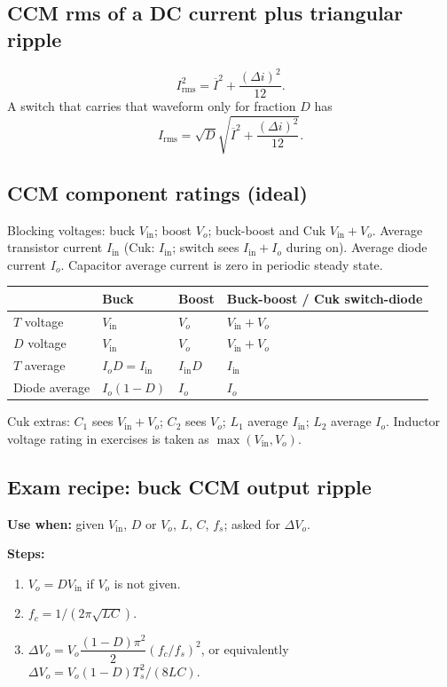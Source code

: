 \subsection{CCM rms of a DC current plus triangular ripple}
\[
I_{\mathrm{rms}}^2=\overline{I}^2+\frac{(\Delta i)^2}{12}.
\]
A switch that carries that waveform only for fraction \(D\) has
\[
I_{\mathrm{rms}}=\sqrt{D}\sqrt{\overline{I}^2+\frac{(\Delta i)^2}{12}}.
\]

\subsection{CCM component ratings (ideal)}
Blocking voltages: buck \(V_{\mathrm{in}}\); boost \(V_o\); buck-boost and Cuk \(V_{\mathrm{in}}+V_o\). Average transistor current \(I_{\mathrm{in}}\) (Cuk: \(I_{\mathrm{in}}\); switch sees \(I_{\mathrm{in}}+I_o\) during on). Average diode current \(I_o\). Capacitor average current is zero in periodic steady state.

\begin{center}
\begin{tabular}{@{}llll@{}}
\toprule
 & Buck & Boost & Buck-boost / Cuk switch-diode\\
\midrule
\(T\) voltage & \(V_{\mathrm{in}}\) & \(V_o\) & \(V_{\mathrm{in}}+V_o\)\\
\(D\) voltage & \(V_{\mathrm{in}}\) & \(V_o\) & \(V_{\mathrm{in}}+V_o\)\\
\(T\) average & \(I_o D=I_{\mathrm{in}}\) & \(I_{\mathrm{in}} D\) & \(I_{\mathrm{in}}\)\\
Diode average & \(I_o(1-D)\) & \(I_o\) & \(I_o\)\\
\bottomrule
\end{tabular}
\end{center}
Cuk extras: \(C_1\) sees \(V_{\mathrm{in}}+V_o\); \(C_2\) sees \(V_o\); \(L_1\) average \(I_{\mathrm{in}}\); \(L_2\) average \(I_o\). Inductor voltage rating in exercises is taken as \(\max(V_{\mathrm{in}},V_o)\).

\subsection{Exam recipe: buck CCM output ripple}
\textbf{Use when:} given \(V_{\mathrm{in}}\), \(D\) or \(V_o\), \(L\), \(C\), \(f_s\); asked for \(\Delta V_o\).

\textbf{Steps:}
\begin{enumerate}
  \item \(V_o=D V_{\mathrm{in}}\) if \(V_o\) is not given.
  \item \(f_c=1/(2\pi\sqrt{LC})\).
  \item \(\Delta V_o=V_o\dfrac{(1-D)\pi^2}{2}(f_c/f_s)^2\), or equivalently \(\Delta V_o=V_o(1-D)T_s^2/(8LC)\).
\end{enumerate}

